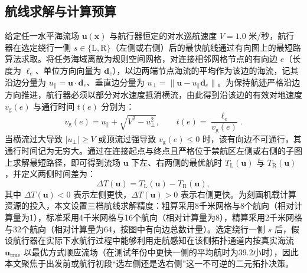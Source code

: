 \subsection{航线求解与计算预算}
给定任一水平海流场 $\boldsymbol{u}(\boldsymbol{x})$ 与航行器恒定的对水巡航速度 $V = 1.0$ 米/秒，航行器在选定绕行一侧 $s \in \{\text{L}, \text{R}\}$（左侧或右侧）后的最快航线通过有向图上的最短路算法求取\cite{dijkstra1959note}。将任务海域离散为规则空间网格，对连接相邻网格节点的有向边 $e$（长度为 $\ell_e$、单位方向向量为 $\boldsymbol{d}_e$），以边两端节点海流的平均作为该边的海流，记其沿边分量为 $u_{\parallel} = \boldsymbol{u} \cdot \boldsymbol{d}_e$、垂直边分量为 $u_{\perp} = \|\boldsymbol{u} - u_{\parallel}\boldsymbol{d}_e\|$。为保持航迹严格沿边方向推进，航行器必须以部分对水速度抵消横流，由此得到沿该边的有效对地速度 $v_{\text{g}}(e)$ 与通行时间 $t(e)$ 分别为：
\begin{equation}
v_{\text{g}}(e) = u_{\parallel} + \sqrt{V^2 - u_{\perp}^2}, \qquad t(e) = \frac{\ell_e}{v_{\text{g}}(e)}.
\label{eq:edge_time}
\end{equation}
当横流过大导致 $|u_{\perp}| \ge V$ 或顶流过强导致 $v_{\text{g}}(e) \le 0$ 时，该有向边不可通行，其通行时间记为无穷大。通过在连接起点与终点且严格位于禁航区左侧或右侧的子图上求解最短路径，即可得到流场 $\boldsymbol{u}$ 下左、右两侧的最优航时 $T_{\text{L}}(\boldsymbol{u})$ 与 $T_{\text{R}}(\boldsymbol{u})$，并定义两侧时间差为：
\begin{equation}
\Delta T(\boldsymbol{u}) = T_{\text{L}}(\boldsymbol{u}) - T_{\text{R}}(\boldsymbol{u}),
\label{eq:delta_t}
\end{equation}
其中 $\Delta T(\boldsymbol{u}) < 0$ 表示左侧更快，$\Delta T(\boldsymbol{u}) > 0$ 表示右侧更快。为刻画机载计算资源的投入，本文设置三档航线求解精度：粗算采用8千米网格与8个航向（相对计算量为1），标准采用4千米网格与16个航向（相对计算量为8），精算采用2千米网格与32个航向（相对计算量为64，按图中有向边总数计量）。选定绕行一侧 $s$ 后，假设航行器在实际下水航行过程中能够利用走航感知在该侧拓扑通道内按真实海流 $\boldsymbol{u}_{\text{true}}$ 以最优方式顺应流场（在测试年份中更快一侧的平均航时为39.2小时），因此本文聚焦于出发前或航行初段“选左侧还是选右侧”这一不可逆的二元拓扑决策。

